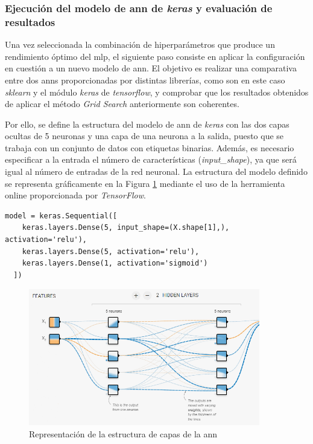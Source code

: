 \subsubsection{Ejecución del modelo de \acrshort{ann} de \textit{keras} y evaluación de resultados}

Una vez seleccionada la combinación de hiperparámetros que produce un rendimiento óptimo del \gls{mlp}, el siguiente paso consiste en aplicar la configuración en cuestión a un nuevo modelo de \gls{ann}. El objetivo es realizar una comparativa entre dos \gls{ann}s proporcionadas por distintas librerías, como son en este caso \textit{sklearn} y el módulo \textit{keras} de \textit{tensorflow}, y comprobar que los resultados obtenidos de aplicar el método \textit{Grid Search} anteriormente son coherentes. 

\vspace{3mm}

Por ello, se define la estructura del modelo de \gls{ann} de \textit{keras} con las dos capas ocultas de 5 neuronas y una capa de una neurona a la salida, puesto que se trabaja con un conjunto de datos con etiquetas binarias. Además, es necesario especificar a la entrada el número de características (\textit{input\_shape}), ya que será igual al número de entradas de la red neuronal. La estructura del modelo definido se representa gráficamente en la Figura \ref{fig:neuronas} mediante el uso de la herramienta online proporcionada por \textit{TensorFlow}. \cite{seq}

\vspace{3mm}

\begin{lstlisting}[style=Python, caption={Definición del modelo de ANN de Keras}]
  model = keras.Sequential([
    keras.layers.Dense(5, input_shape=(X.shape[1],), activation='relu'), 
    keras.layers.Dense(5, activation='relu'),
    keras.layers.Dense(1, activation='sigmoid') 
  ]) 
\end{lstlisting}

\vspace{3mm}

\begin{figure}[H]
  \centering
  \includegraphics[width=0.9\textwidth]{img/desarrollo/ann/neuronas.png}
  \caption{Representación de la estructura de capas de la \gls{ann} \cite{tensorflow}}
  \label{fig:neuronas}
\end{figure}

